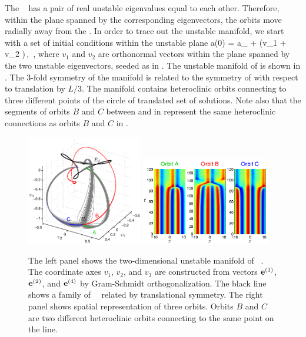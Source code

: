 The \eqv\  has a pair of real unstable eigenvalues
equal to each other.  Therefore, within the plane spanned by the
corresponding eigenvectors, the orbits move radially away from
the \eqv.  In order to trace out the unstable manifold,
we start with a set of initial conditions within the unstable plane
\beq
 a(0) = a_{{}} + \epsilon(v_1 \cos \phi + v_2 \sin \phi)\,,
  \quad\phi\in[0,2\pi]\,,
\label{unsManSeed}
\eeq
where $v_1$ and $v_2$ are orthonormal vectors within the
plane spanned by the two unstable eigenvectors, seeded as in
.
  The unstable manifold
of  is shown in .  The 3-fold symmetry of
the manifold is related to the symmetry of  with respect to
translation by $L/3$.  The manifold contains heteroclinic orbits
connecting  to three different points of the circle of {\eqva}
 translated set of solutions. Note also that the segments of orbits $B$ and $C$
between  and  in 
represent the same heteroclinic connections as orbits $B$ and $C$ in
.

\begin{figure}[h!t]
\begin{center}
 \includegraphics[width=0.45\textwidth]{../figs/ks22_E3_manifold}
 \includegraphics[width=0.5\textwidth]{../figs/ks22_E3_orbits_c}
\end{center}
\caption[Unstable manifold of \eqv\ ]{
The left panel shows the two-dimensional
unstable manifold of \eqv\ . The coordinate axes
$v_1$, $v_2$, and $v_3$ are constructed from vectors
${\mathbf e}^{(1)}$, ${\mathbf e}^{(2)}$, and ${\mathbf e}^{(4)}$ by Gram-Schmidt orthogonalization.
The black line shows a family of ~\eqva\ related by translational
symmetry. The right panel shows spatial representation of
three orbits. Orbits $B$ and $C$ are two different heteroclinic orbits
connecting  to the same point on the  line.
        }
\label{f:KS22E3man}
\end{figure}

